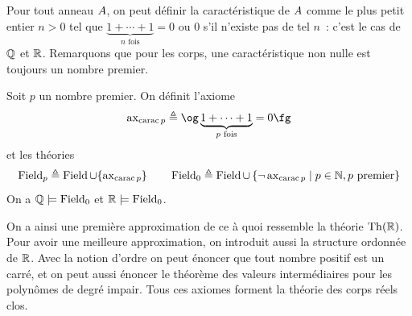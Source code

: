 Pour tout anneau $A$, on peut définir la caractéristique de $A$
comme le plus petit entier $n > 0$ tel que
$\underbrace{1+\cdots+1}_{n\text{ fois}} = 0$ ou $0$ s'il n'existe pas de tel
$n$~: c'est le cas de $\mathbb Q$ et $\mathbb R$. Remarquons que pour les corps, une
caractéristique non nulle est toujours un nombre premier.

\begin{definition}
  Soit $p$ un nombre premier. On définit l'axiome
  \[\Rax_{\carac p} \defeq \ogM\underbrace{1+\cdots+1}_{p\text{ fois}} = 0\fgM\]
  et les théories
  \[\operatorname{Field}_p \triangleq \operatorname{Field}\cup\{\operatorname{ax}_{\operatorname{carac} p}\}\qquad
  \operatorname{Field}_0 \triangleq \operatorname{Field}\cup
  \left\{ \lnot\operatorname{ax}_{\operatorname{carac} p} \;\middle\vert\; p \in \mathbb N,p\text{ premier} \right\}\]
  On a $\mathbb Q\models\operatorname{Field}_0$ et $\mathbb R\models\operatorname{Field}_0$.
\end{definition}

On a ainsi une première approximation de ce à quoi ressemble la théorie
$\operatorname{Th}(\mathbb R)$. Pour avoir une meilleure approximation, on introduit aussi la
structure ordonnée de $\mathbb R$. Avec la notion d'ordre on peut énoncer que tout
nombre positif est un carré, et on peut aussi énoncer le théorème des
valeurs intermédiaires pour les polynômes de degré impair. Tous ces axiomes
forment la théorie des corps réels clos.

